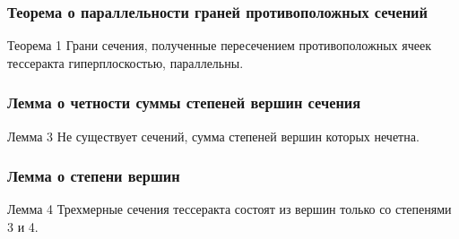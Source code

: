 \documentclass[10pt,pdf,hyperref={unicode}]{beamer}
\begin{document}
\begin{frame}
	\frametitle{Теорема о параллельности граней противоположных сечений}
	\begin{block}{Теорема 1}
		Грани сечения, полученные пересечением противоположных ячеек тессеракта гиперплоскостью, параллельны.
	\end{block}
\end{frame}
\begin{frame}
	\frametitle{Лемма о четности суммы степеней вершин сечения}
	\begin{block}{Лемма 3}
		Не существует сечений, сумма степеней вершин которых нечетна.
	\end{block}
\end{frame}
\begin{frame}
	\frametitle{Лемма о степени вершин}
	\begin{block}{Лемма 4}
		Трехмерные сечения тессеракта состоят из вершин только со степенями 3 и 4.
	\end{block}
\end{frame}
\end{document}
